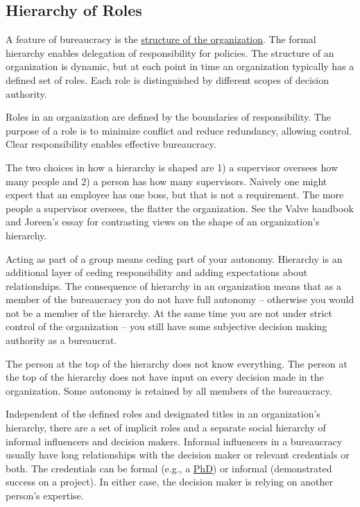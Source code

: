 \subsection{Hierarchy of Roles\label{sec:hierarchy_of_roles}}

A feature of bureaucracy is the \href{https://en.wikipedia.org/wiki/Organizational_structure}{structure of the organization}. The formal hierarchy enables delegation of responsibility for policies. The structure of an organization is dynamic, but at each point in time an organization typically has a defined set of roles. Each role is distinguished by different scopes of decision authority. 

Roles in an organization are defined by the boundaries of responsibility. The purpose of a role is to minimize conflict and reduce redundancy, allowing control. Clear responsibility enables effective bureaucracy. 


The two choices in how a hierarchy is shaped are 1) a supervisor oversees how many people and 2) a person has how many supervisors. Naively one might expect that an employee has one boss, but that is not a requirement. 
The more people a supervisor oversees, the flatter the organization. See the Valve handbook \cite{2012_Valve} and Joreen's essay \cite{1972_Joreen} for contrasting views on the shape of an organization's hierarchy.

Acting as part of a group means ceding part of your autonomy. Hierarchy is an additional layer of ceding responsibility and adding expectations about relationships.
The consequence of hierarchy in an organization means that as a member of the bureaucracy you do not have full autonomy -- otherwise you would not be a member of the hierarchy. At the same time you are not under strict control of the organization -- you still have some subjective decision making authority as a bureaucrat.

The person at the top of the hierarchy does not know everything. The person at the top of the hierarchy does not have input on every decision made in the organization. Some autonomy is retained by all members of the bureaucracy.

Independent of the defined roles and designated titles in an organization's hierarchy, there are a set of implicit roles and a separate social hierarchy of informal influencers and decision makers. Informal influencers in a bureaucracy usually have long relationships with the decision maker or relevant credentials or both. The credentials can be formal (e.g., a \href{https://en.wikipedia.org/wiki/Doctor_of_Philosophy}{PhD}) or informal (demonstrated success on a project). In either case, the decision maker is relying on another person's expertise. 

